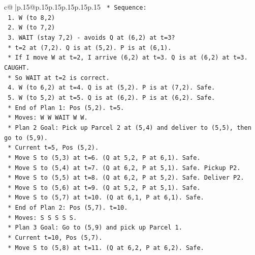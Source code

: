 \documentclass{article}
\begin{document}
{\begin{supertabular}{c@{$\;$}|p{.15\linewidth}@{}p{.15\linewidth}p{.15\linewidth}p{.15\linewidth}p{.15\linewidth}p{.15\linewidth}}
{{{\texttt{            *   Sequence:} \\
\texttt{                1.  W (to 8,2)} \\
\texttt{                2.  W (to 7,2)} \\
\texttt{                3.  WAIT (stay 7,2) {-} avoids Q at (6,2) at t=3?} \\
\texttt{                    *   t=2 at (7,2). Q is at (5,2). P is at (6,1).} \\
\texttt{                    *   If I move W at t=2, I arrive (6,2) at t=3. Q is at (6,2) at t=3. CAUGHT.} \\
\texttt{                    *   So WAIT at t=2 is correct.} \\
\texttt{                4.  W (to 6,2) at t=4. Q is at (5,2). P is at (7,2). Safe.} \\
\texttt{                5.  W (to 5,2) at t=5. Q is at (6,2). P is at (6,2). Safe.} \\
\texttt{                *   End of Plan 1: Pos (5,2). t=5.} \\
\texttt{                *   Moves: W W WAIT W W.} \\
\texttt{            *   Plan 2 Goal: Pick up Parcel 2 at (5,4) and deliver to (5,5), then go to (5,9).} \\
\texttt{                *   Current t=5, Pos (5,2).} \\
\texttt{                *   Move S to (5,3) at t=6. (Q at 5,2, P at 6,1). Safe.} \\
\texttt{                *   Move S to (5,4) at t=7. (Q at 6,2, P at 5,1). Safe. Pickup P2.} \\
\texttt{                *   Move S to (5,5) at t=8. (Q at 6,2, P at 5,2). Safe. Deliver P2.} \\
\texttt{                *   Move S to (5,6) at t=9. (Q at 5,2, P at 5,1). Safe.} \\
\texttt{                *   Move S to (5,7) at t=10. (Q at 6,1, P at 6,1). Safe.} \\
\texttt{                *   End of Plan 2: Pos (5,7). t=10.} \\
\texttt{                *   Moves: S S S S S.} \\
\texttt{            *   Plan 3 Goal: Go to (5,9) and pick up Parcel 1.} \\
\texttt{                *   Current t=10, Pos (5,7).} \\
\texttt{                *   Move S to (5,8) at t=11. (Q at 6,2, P at 6,2). Safe.} \\
}}}
\end{supertabular}}
\end{document}

